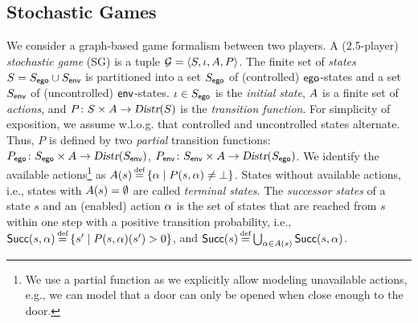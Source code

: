 \subsection{Stochastic Games}
We consider a graph-based game formalism between two players. A
(2.5-player) \emph{stochastic game} (SG) is a tuple $\mathcal{G} = \langle S,
\iota, A, P \rangle$.  The finite set of \emph{states} $S = S_{\mathsf{ego}} \cup
S_{\mathsf{env}}$ is partitioned into a set $S_{\mathsf{ego}}$ of (controlled)
$\mathsf{ego}$-states and a set $S_{\mathsf{env}}$ of (uncontrolled)
$\mathsf{env}$-states. $\iota \in S_{\mathsf{ego}}$ is the \emph{initial state}, $A$ is a
finite set of \emph{actions}, and $P\colon S \times A \rightarrow
\textsl{Distr}(S)$ is the \emph{transition function}. For simplicity of
exposition, we assume w.l.o.g. that controlled and uncontrolled
states alternate. Thus, $P$ is defined by two \emph{partial} transition functions:
$P_{\mathsf{ego}}\colon S_{\mathsf{ego}} \times A \rightarrow \textsl{Distr}(S_{\mathsf{env}})$,
$P_{\mathsf{env}}\colon S_{\mathsf{env}} \times A \rightarrow \textsl{Distr}(S_{\mathsf{ego}})$. We
identify the available actions\footnote{We use a partial function as we explicitly allow modeling 
unavailable actions, e.g., we can model that a door can only be opened
when close enough to the door.} as $\EnAct(s) \eqdef \{ \act \mid
P(s,\act) \neq \bot \}$. States without available actions, i.e.,
states with $A(s) = \emptyset$ are called \emph{terminal states}.
The \emph{successor
states} of a state $s$ and an (enabled) action $\alpha$ is the set of
states that are reached from $s$ within one step with a positive
transition probability, i.e., $\Succ(s,\act) \eqdef \{ s' \mid
P(s,\act)(s')>0 \}$, and $\Succ(s) \eqdef\bigcup_{\act \in \EnAct(s)}
\Succ(s,\act)$.


